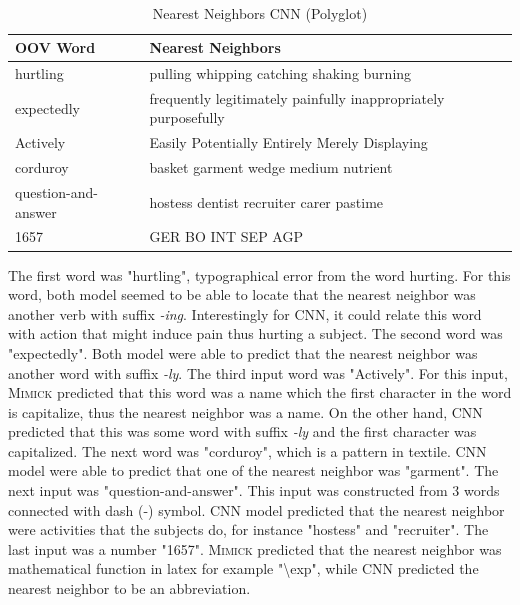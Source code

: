         \begin{table}[H]
          \begin{center}
            \caption{Nearest Neighbors CNN (Polyglot)}
            ~\\
            \footnotesize
            \label{tab:nearest:cnn-polyglot}
            \begin{tabular}{l|l}
              \textbf{OOV Word} & \textbf{Nearest Neighbors}\\
              \hline
              hurtling & pulling whipping catching shaking burning\\
              expectedly & frequently legitimately painfully inappropriately purposefully\\
              Actively & Easily Potentially Entirely Merely Displaying\\
              corduroy & basket garment wedge medium nutrient\\
              question-and-answer & hostess dentist recruiter carer pastime\\
              1657 & GER BO INT SEP AGP\\
            \end{tabular}
          \end{center}
        \end{table}

        The first word was "hurtling", typographical error from the
        word hurting. For this word, both model seemed to be able to
        locate that the nearest neighbor was another verb with suffix
        \textit{-ing}. Interestingly for CNN, it could relate this
        word with action that might induce pain thus hurting a
        subject. The second word was "expectedly". Both model were
        able to predict that the nearest neighbor was another word
        with suffix \textit{-ly}. The third input word was "Actively".
        For this input, \textsc{Mimick} predicted that this word was a
        name which the first character in the word is capitalize, thus
        the nearest neighbor was a name. On the other hand, CNN
        predicted that this was some word with suffix \textit{-ly} and
        the first character was capitalized. The next word was
        "corduroy", which is a pattern in textile. CNN model were able
        to predict that one of the nearest neighbor was "garment". The
        next input was "question-and-answer". This input was constructed
        from 3 words connected with dash (-) symbol. CNN model
        predicted that the nearest neighbor were activities that the
        subjects do, for instance "hostess" and "recruiter". The last
        input was a number "1657". \textsc{Mimick} predicted that the
        nearest neighbor was mathematical function in latex for example
        "\textbackslash exp", while CNN predicted the nearest neighbor
        to be an abbreviation.

